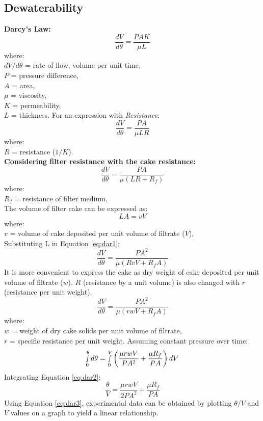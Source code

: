 \documentclass[a4paper, landscape]{article}
\begin{document}
\begin{multicols}{4}
\subsection*{Dewaterability}
\textbf{Darcy's Law:}
\[
\frac{dV}{d\theta} = \frac{PAK}{\mu L}
\]
where:\\
$dV/d\theta$ = rate of flow, volume per unit time,\\
$P$ = pressure difference,\\
$A$ = area,\\
$\mu$ = viscosity,\\
$K$ = permeability,\\
$L$ = thickness.
For an expression with \textsl{Resistance}:
\[
\frac{dV}{d\theta} = \frac{PA}{\mu LR}
\]
where:\\
$R$ = resistance ($1/K$).\\
\textbf{Considering filter resistance with the cake resistance:}
\begin{equation}
    \frac{dV}{d\theta} = \frac{PA}{\mu (LR+R_f)}
\label{eq:dar1}
\end{equation}
where:\\
$R_f$ = resistance of filter medium.\\
The volume of filter cake can be expressed as:
\[
LA = vV
\]
where:\\
$v$ = volume of cake deposited per unit volume of filtrate ($V$),\\
Substituting L in Equation \ref{eq:dar1}:
\[
\frac{dV}{d\theta} = \frac{PA^2}{\mu (RvV+R_fA)}
\]
It is more convenient to express the cake as dry weight of cake deposited per unit volume of filtrate ($w$). $R$ (resistance by a unit volume) is also changed with $r$ (resistance per unit weight).
\[
\frac{dV}{d\theta} = \frac{PA^2}{\mu (rwV+R_fA)}
\]
where:\\
$w$ = weight of dry cake solids per unit volume of filtrate,\\
$r$ = specific resistance per unit weight.
Assuming constant pressure over time:
\begin{equation}
    \smallint_{0}^{\theta} d\theta = \smallint_{0}^{V} \left( \frac{\mu rwV}{PA^2}+\frac{\mu R_f}{PA}\right)dV \label{eq:dar2}
\end{equation}
Integrating Equation \ref{eq:dar2}:
\begin{equation}
    \frac{\theta}{V} = \frac{\mu rwV}{2 P A^2} + \frac{\mu R_f}{P A} \label{eq:dar3}
\end{equation}
Using Equation \ref{eq:dar3}, experimental data can be obtained by plotting $\theta/V$ and $V$ values on a graph to yield a linear relationship.

\end{multicols}
\end{document}
